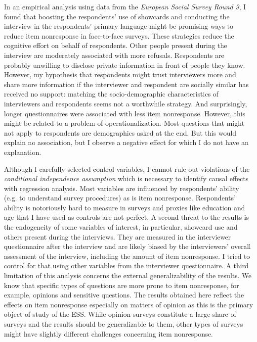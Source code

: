 \documentclass[a4paper,12pt]{article}
\begin{document}
In an empirical analysis using data from the \textit{European Social Survey Round 9}, I found that boosting the respondents' use of showcards and conducting the interview in the respondents' primary language might be promising ways to reduce item nonresponse in face-to-face surveys. These strategies reduce the cognitive effort on behalf of respondents. Other people present during the interview are moderately associated with more refusals. Respondents are probably unwilling to disclose private information in front of people they know. However, my hypothesis that respondents might trust interviewers more and share more information if the interviewer and respondent are socially similar has received no support: matching the socio-demographic characteristics of interviewers and respondents seems not a worthwhile strategy. And surprisingly, longer questionnaires were associated with less item nonresponse. However, this might be related to a problem of operationalization. Most questions that might not apply to respondents are demographics asked at the end. But this would explain no association, but I observe a negative effect for which I do not have an explanation.

Although I carefully selected control variables, I cannot rule out violations of the \textit{conditional independence assumption} which is necessary to identify causal effects with regression analysis. Most variables are influenced by respondents' ability (e.g. to understand survey procedures) as is item nonresponse. Respondents' ability is notoriously hard to measure in surveys and proxies like education and age that I have used as controls are not perfect. A second threat to the results is the endogeneity of some variables of interest, in particular, showcard use and others present during the interviews. They are measured in the interviewer questionnaire after the interview and are likely biased by the interviewers' overall assessment of the interview, including the amount of item nonresponse. I tried to control for that using other variables from the interviewer questionnaire. A third limitation of this analysis concerns the external generalizability of the results. We know that specific types of questions are more prone to item nonresponse, for example, opinions and sensitive questions. The results obtained here reflect the effects on item nonresponse especially on matters of opinion as this is the primary object of study of the ESS. While opinion surveys constitute a large share of surveys and the results should be generalizable to them, other types of surveys might have slightly different challenges concerning item nonresponse.
\end{document}
